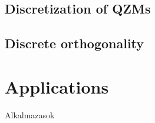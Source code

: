 \subsection{Discretization of QZMs}
\subsection{Discrete orthogonality}


\section{Applications}
Alkalmazasok








